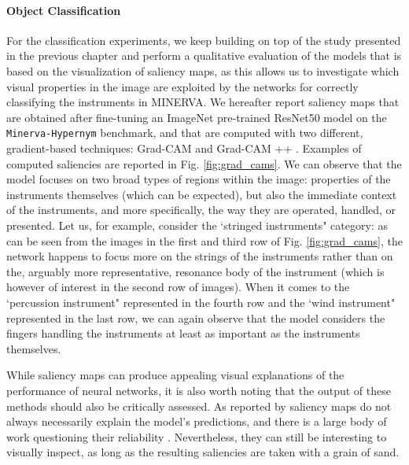 \paragraph{Object Classification}
For the classification experiments, we keep building on top of the study presented in the previous chapter and perform a qualitative evaluation of the models that is based on the visualization of saliency maps, as this allows us to investigate which visual properties in the image are exploited by the networks for correctly classifying the instruments in MINERVA. We hereafter report saliency maps that are obtained after fine-tuning an ImageNet pre-trained ResNet50 model on the \texttt{Minerva-Hypernym} benchmark, and that are computed with two different, gradient-based techniques: Grad-CAM \cite{selvaraju2017grad} and Grad-CAM ++ \cite{chattopadhay2018grad}. Examples of computed saliencies are reported in Fig. \ref{fig:grad_cams}. We can observe that the model focuses on two broad types of regions within the image: properties of the instruments themselves (which can be expected), but also the immediate context of the instruments, and more specifically, the way they are operated, handled, or presented. Let us, for example, consider the `stringed instruments" category: as can be seen from the images in the first and third row of Fig. \ref{fig:grad_cams}, the network happens to focus more on the strings of the instruments rather than on the, arguably more representative, resonance body of the instrument (which is however of interest in the second row of images). When it comes to the `percussion instrument" represented in the fourth row and the `wind instrument" represented in the last row, we can again observe that the model considers the fingers handling the instruments at least as important as the instruments themselves.  

While saliency maps can produce appealing visual explanations of the performance of neural networks, it is also worth noting that the output of these methods should also be critically assessed. As reported by \citet{alqaraawi2020evaluating} saliency maps do not always necessarily explain the model's predictions, and there is a large body of work questioning their reliability \cite{simonyan2013deep,arun2020assessing,saporta2021deep}. Nevertheless, they can still be interesting to visually inspect, as long as the resulting saliencies are taken with a grain of sand. 

